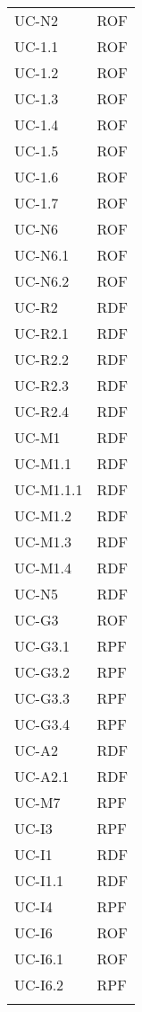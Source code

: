 \begin{longtable}{| p{5cm} | p{5cm} |}
		UC-N2& ROF  \\
		\rowcolor{LightGray}
		UC-1.1 & ROF \\
		UC-1.2 & ROF \\
		\rowcolor{LightGray}
		UC-1.3 & ROF \\
		UC-1.4 & ROF \\
		\rowcolor{LightGray}
		UC-1.5 & ROF \\
		UC-1.6 & ROF \\
		\rowcolor{LightGray}
		UC-1.7 & ROF \\		
		UC-N6 & ROF \\
		\rowcolor{LightGray}
		UC-N6.1 & ROF \\
		UC-N6.2 & ROF \\
		\rowcolor{LightGray}
		UC-R2 & RDF \\
		UC-R2.1 & RDF \\
		\rowcolor{LightGray}
		UC-R2.2 & RDF \\
		UC-R2.3 & RDF \\
		\rowcolor{LightGray}
		UC-R2.4 & RDF \\
		UC-M1 & RDF \\
		\rowcolor{LightGray}
		UC-M1.1 & RDF\\
		UC-M1.1.1 & RDF\\
		UC-M1.2 & RDF\\
		UC-M1.3 & RDF\\
		UC-M1.4 & RDF\\
		\rowcolor{LightGray}
		UC-N5 & RDF \\
		UC-G3 & ROF \\
		\rowcolor{LightGray}
		UC-G3.1 & RPF \\
		\rowcolor{LightGray}
		UC-G3.2 & RPF \\
		UC-G3.3 & RPF \\
		UC-G3.4 & RPF \\
		\rowcolor{LightGray}
		UC-A2 & RDF \\
		UC-A2.1 & RDF \\
		UC-M7 & RPF \\
		\rowcolor{LightGray}
		UC-I3 & RPF \\
		UC-I1 & RDF \\
		UC-I1.1 & RDF \\
		\rowcolor{LightGray}
		UC-I4 & RPF \\
		UC-I6 & ROF \\
		\rowcolor{LightGray}
		UC-I6.1 & ROF \\
		UC-I6.2 & RPF \\
		\rowcolor{LightGray}

\end{longtable}
